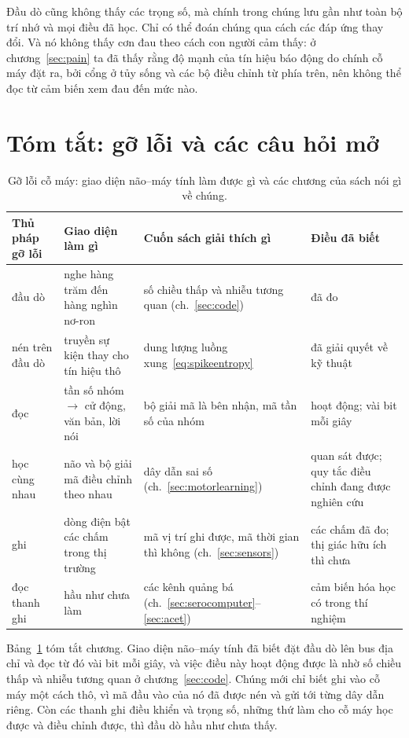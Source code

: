 Đầu dò cũng không thấy các trọng số, mà chính trong chúng lưu gần như toàn bộ trí nhớ và mọi điều đã học. Chỉ có thể đoán chúng qua cách các đáp ứng thay đổi. Và nó không thấy cơn đau theo cách con người cảm thấy: ở chương~\ref{sec:pain} ta đã thấy rằng độ mạnh của tín hiệu báo động do chính cỗ máy đặt ra, bởi cổng ở tủy sống và các bộ điều chỉnh từ phía trên, nên không thể đọc từ cảm biến xem đau đến mức nào.

\section{Tóm tắt: gỡ lỗi và các câu hỏi mở}

\begin{table}[t]
\centering
\footnotesize
\setlength{\tabcolsep}{4pt}
\renewcommand{\arraystretch}{1.15}
\begin{tabular}{>{\raggedright}p{2.2cm}>{\raggedright}p{3.6cm}>{\raggedright}p{3.4cm}>{\raggedright\arraybackslash}p{4.0cm}}
\toprule
Thủ pháp gỡ lỗi & Giao diện làm gì & Cuốn sách giải thích gì & Điều đã biết \\
\midrule
đầu dò & nghe hàng trăm đến hàng nghìn nơ-ron & số chiều thấp và nhiễu tương quan (ch.~\ref{sec:code}) & đã đo \\
nén trên đầu dò & truyền sự kiện thay cho tín hiệu thô & dung lượng luồng xung~\eqref{eq:spikeentropy} & đã giải quyết về kỹ thuật \\
đọc & tần số nhóm $\to$ cử động, văn bản, lời nói & bộ giải mã là bên nhận, mã tần số của nhóm & hoạt động; vài bit mỗi giây \\
học cùng nhau & não và bộ giải mã điều chỉnh theo nhau & dây dẫn sai số (ch.~\ref{sec:motorlearning}) & quan sát được; quy tắc điều chỉnh đang được nghiên cứu \\
ghi & dòng điện bật các chấm trong thị trường & mã vị trí ghi được, mã thời gian thì không (ch.~\ref{sec:sensors}) & các chấm đã đo; thị giác hữu ích thì chưa \\
đọc thanh ghi & hầu như chưa làm & các kênh quảng bá (ch.~\ref{sec:serocomputer}--\ref{sec:acet}) & cảm biến hóa học có trong thí nghiệm \\
\bottomrule
\end{tabular}
\caption{Gỡ lỗi cỗ máy: giao diện não--máy tính làm được gì và các chương của sách nói gì về chúng.}
\label{tab:debugging}
\end{table}

Bảng~\ref{tab:debugging} tóm tắt chương. Giao diện não--máy tính đã biết đặt đầu dò lên bus địa chỉ và đọc từ đó vài bit mỗi giây, và việc điều này hoạt động được là nhờ số chiều thấp và nhiễu tương quan ở chương~\ref{sec:code}. Chúng mới chỉ biết ghi vào cỗ máy một cách thô, vì mã đầu vào của nó đã được nén và gửi tới từng dây dẫn riêng. Còn các thanh ghi điều khiển và trọng số, những thứ làm cho cỗ máy học được và điều chỉnh được, thì đầu dò hầu như chưa thấy.


